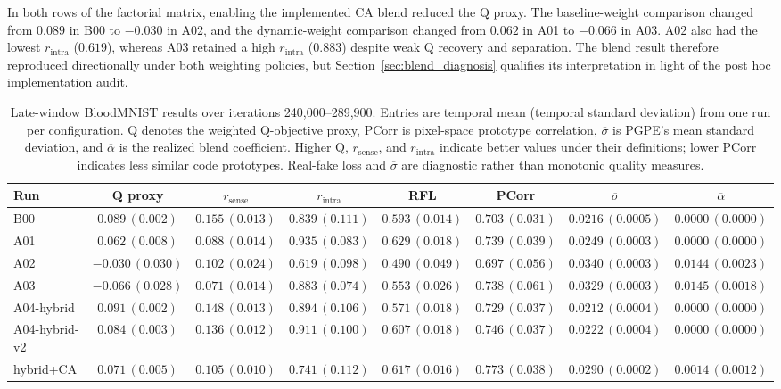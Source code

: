 In both rows of the factorial matrix, enabling the implemented CA blend reduced the Q proxy. The baseline-weight comparison changed from $0.089$ in B00 to $-0.030$ in A02, and the dynamic-weight comparison changed from $0.062$ in A01 to $-0.066$ in A03. A02 also had the lowest $r_{\text{intra}}$ ($0.619$), whereas A03 retained a high $r_{\text{intra}}$ ($0.883$) despite weak Q recovery and separation. The blend result therefore reproduced directionally under both weighting policies, but Section~\ref{sec:blend_diagnosis} qualifies its interpretation in light of the post hoc implementation audit.

\begin{table}[t]
\centering
\caption{Late-window BloodMNIST results over iterations 240,000--289,900. Entries are temporal mean (temporal standard deviation) from one run per configuration. Q denotes the weighted Q-objective proxy, PCorr is pixel-space prototype correlation, $\overline{\sigma}$ is PGPE's mean standard deviation, and $\overline{\alpha}$ is the realized blend coefficient. Higher Q, $r_{\mathrm{sense}}$, and $r_{\mathrm{intra}}$ indicate better values under their definitions; lower PCorr indicates less similar code prototypes. Real-fake loss and $\overline{\sigma}$ are diagnostic rather than monotonic quality measures.}
\label{tab:late_results}
\scriptsize
\setlength{\tabcolsep}{3.5pt}
\begin{tabular}{lccccccc}
\toprule
Run & Q proxy & $r_{\text{sense}}$ & $r_{\text{intra}}$ & RFL & PCorr & $\overline{\sigma}$ & $\overline{\alpha}$ \\
\midrule
B00 & $0.089\,(0.002)$ & $0.155\,(0.013)$ & $0.839\,(0.111)$ & $0.593\,(0.014)$ & $0.703\,(0.031)$ & $0.0216\,(0.0005)$ & $0.0000\,(0.0000)$ \\
A01 & $0.062\,(0.008)$ & $0.088\,(0.014)$ & $0.935\,(0.083)$ & $0.629\,(0.018)$ & $0.739\,(0.039)$ & $0.0249\,(0.0003)$ & $0.0000\,(0.0000)$ \\
A02 & $-0.030\,(0.030)$ & $0.102\,(0.024)$ & $0.619\,(0.098)$ & $0.490\,(0.049)$ & $0.697\,(0.056)$ & $0.0340\,(0.0003)$ & $0.0144\,(0.0023)$ \\
A03 & $-0.066\,(0.028)$ & $0.071\,(0.014)$ & $0.883\,(0.074)$ & $0.553\,(0.026)$ & $0.738\,(0.061)$ & $0.0329\,(0.0003)$ & $0.0145\,(0.0018)$ \\
\midrule
A04-hybrid & $0.091\,(0.002)$ & $0.148\,(0.013)$ & $0.894\,(0.106)$ & $0.571\,(0.018)$ & $0.729\,(0.037)$ & $0.0212\,(0.0004)$ & $0.0000\,(0.0000)$ \\
A04-hybrid-v2 & $0.084\,(0.003)$ & $0.136\,(0.012)$ & $0.911\,(0.100)$ & $0.607\,(0.018)$ & $0.746\,(0.037)$ & $0.0222\,(0.0004)$ & $0.0000\,(0.0000)$ \\
hybrid+CA & $0.071\,(0.005)$ & $0.105\,(0.010)$ & $0.741\,(0.112)$ & $0.617\,(0.016)$ & $0.773\,(0.038)$ & $0.0290\,(0.0002)$ & $0.0014\,(0.0012)$ \\
\bottomrule
\end{tabular}
\end{table}

